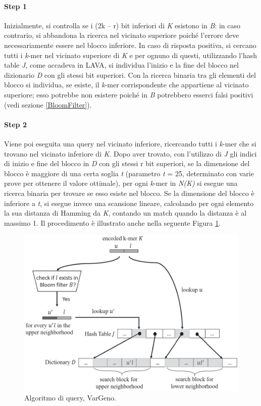 \documentclass[../main.tex]{subfiles}
\begin{document}
\paragraph{Step 1} Inizialmente, si controlla se i (2k – r) bit inferiori di \textit{K} esistono in \textit{B}: in caso contrario, si abbandona la ricerca nel vicinato superiore poiché l'errore deve necessariamente essere nel blocco inferiore. In caso di risposta positiva, si cercano tutti i \textit{k}-mer nel vicinato superiore di \textit{K} e per ognuno di questi, utilizzando l'hash table \textit{J}, come accadeva in LAVA, si individua l'inizio e la fine del blocco nel dizionario \textit{D} con gli stessi bit superiori. Con la ricerca binaria tra gli elementi del blocco si individua, se esiste, il \textit{k}-mer corrispondente che appartiene al vicinato superiore; esso potrebbe non esistere poiché in \textit{B} potrebbero esserci falsi positivi (vedi sezione \ref{BloomFilter}).

\paragraph{Step 2} Viene poi eseguita una query nel vicinato inferiore, ricercando tutti i \textit{k}-mer che si trovano nel vicinato inferiore di \textit{K}. Dopo aver trovato, con l'utilizzo di \textit{J} gli indici di inizio e fine del blocco in \textit{D} con gli stessi r bit superiori, se la dimensione del blocco è maggiore di una certa soglia \textit{t} (parametro \textit{t} = 25, determinato con varie prove per ottenere il valore ottimale), per ogni \textit{k}-mer in \textit{N(K)} si esegue una ricerca binaria per trovare se esso esiste nel blocco. Se la dimensione del blocco è inferiore a \textit{t}, si esegue invece una scansione lineare, calcolando per ogni elemento la sua distanza di Hamming da \textit{K}, contando un match quando la distanza è al massimo 1. Il procedimento è illustrato anche nella seguente Figura \ref{fig:vargeno}.

\begin{figure}[h!]
	\centering
  	\captionsetup{justification=centering}
 	\includegraphics[scale=.40]{images/vargeno-query.png}
  	\caption{Algoritmo di query, VarGeno.}
  	\label{fig:vargeno}
\end{figure}
\end{document}
